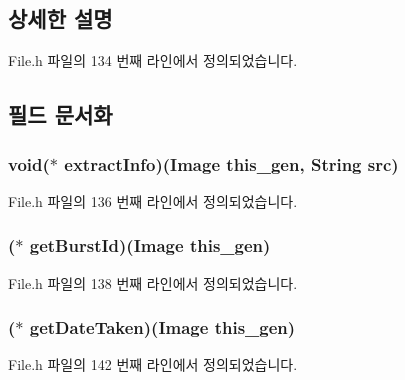 \subsection{상세한 설명}


File.\-h 파일의 134 번째 라인에서 정의되었습니다.



\subsection{필드 문서화}
\hypertarget{struct___image_ab6c9b3a1c46d72f02fd0197b3d154b75}{
\subsubsection[{extract\-Info}]{\setlength{\rightskip}{0pt plus 5cm}void($\ast$  extract\-Info)({\bf Image} this\-\_\-gen, {\bf String} src)}}\label{struct___image_ab6c9b3a1c46d72f02fd0197b3d154b75}


File.\-h 파일의 136 번째 라인에서 정의되었습니다.

\hypertarget{struct___image_a43ccbbf065326a2647887464f16b7373}{
\subsubsection[{get\-Burst\-Id}]{($\ast$  get\-Burst\-Id)({\bf Image} this\-\_\-gen)}}\label{struct___image_a43ccbbf065326a2647887464f16b7373}


File.\-h 파일의 138 번째 라인에서 정의되었습니다.

\hypertarget{struct___image_a170cc9a88ad9e65b2d8725d1370bc946}{
\subsubsection[{get\-Date\-Taken}]{($\ast$  get\-Date\-Taken)({\bf Image} this\-\_\-gen)}}\label{struct___image_a170cc9a88ad9e65b2d8725d1370bc946}


File.\-h 파일의 142 번째 라인에서 정의되었습니다.

